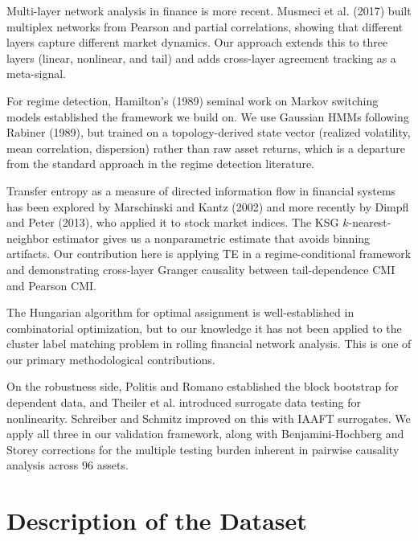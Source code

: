 \documentclass[12pt, letterpaper]{article}
\begin{document}
Multi-layer network analysis in finance is more recent. Musmeci et al. (2017) built multiplex networks from Pearson and partial correlations, showing that different layers capture different market dynamics. Our approach extends this to three layers (linear, nonlinear, and tail) and adds cross-layer agreement tracking as a meta-signal.

For regime detection, Hamilton's (1989) seminal work on Markov switching models established the framework we build on. We use Gaussian HMMs following Rabiner (1989), but trained on a topology-derived state vector (realized volatility, mean correlation, dispersion) rather than raw asset returns, which is a departure from the standard approach in the regime detection literature.

Transfer entropy as a measure of directed information flow in financial systems has been explored by Marschinski and Kantz (2002) and more recently by Dimpfl and Peter (2013), who applied it to stock market indices. The KSG $k$-nearest-neighbor estimator \cite{kraskov2004} gives us a nonparametric estimate that avoids binning artifacts. Our contribution here is applying TE in a regime-conditional framework and demonstrating cross-layer Granger causality between tail-dependence CMI and Pearson CMI.

The Hungarian algorithm \cite{kuhn1955} for optimal assignment is well-established in combinatorial optimization, but to our knowledge it has not been applied to the cluster label matching problem in rolling financial network analysis. This is one of our primary methodological contributions.

On the robustness side, Politis and Romano \cite{politis1992} established the block bootstrap for dependent data, and Theiler et al. \cite{theiler1992} introduced surrogate data testing for nonlinearity. Schreiber and Schmitz \cite{schreiber1996} improved on this with IAAFT surrogates. We apply all three in our validation framework, along with Benjamini-Hochberg \cite{benjamini1995} and Storey \cite{storey2002} corrections for the multiple testing burden inherent in pairwise causality analysis across 96 assets.

\section{Description of the Dataset}
\end{document}
